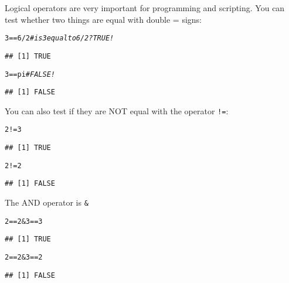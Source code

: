 \documentclass[12pt,a4paper]{scrartcl}\usepackage[]{graphicx}\usepackage[]{color}
\makeatletter
\newcommand{\hlnum}[1]{\textcolor[rgb]{0.686,0.059,0.569}{#1}}%
\newcommand{\hlcom}[1]{\textcolor[rgb]{0.678,0.584,0.686}{\textit{#1}}}%
\newcommand{\hlopt}[1]{\textcolor[rgb]{0,0,0}{#1}}%
\newcommand{\hlstd}[1]{\textcolor[rgb]{0.345,0.345,0.345}{#1}}%
\newenvironment{kframe}{%
 \def\at@end@of@kframe{}%
 \ifinner\ifhmode%
  \def\at@end@of@kframe{\end{minipage}}%
  \begin{minipage}{\columnwidth}%
 \fi\fi%
 \def\FrameCommand##1{\hskip\@totalleftmargin \hskip-\fboxsep
 \colorbox{shadecolor}{##1}\hskip-\fboxsep
     \hskip-\linewidth \hskip-\@totalleftmargin \hskip\columnwidth}%
 \MakeFramed {\advance\hsize-\width
   \@totalleftmargin\z@ \linewidth\hsize
   \@setminipage}}%
 {\par\unskip\endMakeFramed%
 \at@end@of@kframe}
\newenvironment{knitrout}{}{} %
\makeatother
\begin{document}
Logical operators are very important for programming and scripting.
You can test whether two things are equal with double = signs:
\begin{knitrout}
\color{fgcolor}\begin{kframe}
\begin{alltt}
\hlnum{3} \hlopt{==} \hlnum{6}\hlopt{/}\hlnum{2} \hlcom{#is 3 equal to 6/2? TRUE!}
\end{alltt}
\begin{verbatim}
## [1] TRUE
\end{verbatim}
\begin{alltt}
\hlnum{3} \hlopt{==} \hlstd{pi}  \hlcom{# FALSE!}
\end{alltt}
\begin{verbatim}
## [1] FALSE
\end{verbatim}
\end{kframe}
\end{knitrout}

You can also test if they are NOT equal with the operator \texttt{!=}:
\begin{knitrout}
\color{fgcolor}\begin{kframe}
\begin{alltt}
\hlnum{2} \hlopt{!=} \hlnum{3}
\end{alltt}
\begin{verbatim}
## [1] TRUE
\end{verbatim}
\begin{alltt}
\hlnum{2} \hlopt{!=} \hlnum{2}
\end{alltt}
\begin{verbatim}
## [1] FALSE
\end{verbatim}
\end{kframe}
\end{knitrout}

The AND operator is \texttt{\&}
\begin{knitrout}
\color{fgcolor}\begin{kframe}
\begin{alltt}
\hlnum{2} \hlopt{==} \hlnum{2} \hlopt{&} \hlnum{3}\hlopt{==}\hlnum{3}
\end{alltt}
\begin{verbatim}
## [1] TRUE
\end{verbatim}
\begin{alltt}
\hlnum{2} \hlopt{==}\hlnum{2} \hlopt{&} \hlnum{3}\hlopt{==}\hlnum{2}
\end{alltt}
\begin{verbatim}
## [1] FALSE
\end{verbatim}
\end{kframe}
\end{knitrout}
\end{document}
